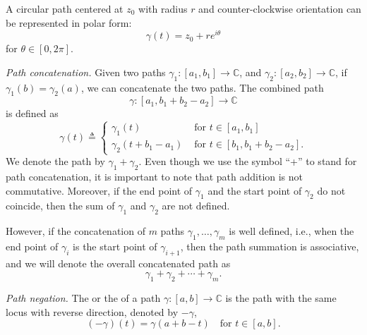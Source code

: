 

A circular path centered at $z_0$ with radius $r$ and counter-clockwise orientation can be represented in polar form:
\begin{equation}
\gamma(t) = z_0 + re^{i\theta}
\label{eq:circular_path}
\end{equation}
for $\theta\in[0, 2 \pi ]$.

{\em Path concatenation.} Given two paths $\gamma_1: [a_1,b_1] \rightarrow \mathbb{C}$, and $\gamma_2: [a_2,b_2] \rightarrow \mathbb{C}$, if $\gamma_1(b)=\gamma_2(a)$, we can concatenate the two paths. The combined path 
$$\gamma: [a_1,b_1+b_2-a_2] \rightarrow \mathbb{C}$$ 
is defined as
$$
\gamma(t) \triangleq \begin{cases}
	\gamma_1(t) & \text{ for } t \in [a_1,b_1] \\
	\gamma_2(t+b_1-a_1) & \text{ for } t \in [b_1, b_1+b_2-a_2].
\end{cases} 
$$
We denote the  path by $\gamma_1+\gamma_2$. Even though we use the symbol ``+'' to stand for path concatenation, it is important to note that path addition is not commutative. Moreover, if the end point of $\gamma_1$ and the start point of $\gamma_2$ do not coincide, then the sum of $\gamma_1$ and $\gamma_2$ are not defined.

However, if the concatenation of $m$ paths $\gamma_1,\ldots, \gamma_m$ is well defined, i.e., when the end point of $\gamma_i$ is the start point of $\gamma_{i+1}$, then the path summation is associative, and we will denote the overall concatenated path as
$$\gamma_1 + \gamma_2 + \cdots + \gamma_m.
$$


{\em Path negation.}
The  or the  of a path $\gamma:[a,b]\rightarrow\mathbb{C}$ is the path with the same locus with reverse direction, denoted by $-\gamma$,
$$
(-\gamma)(t) = \gamma(a+b-t) \quad \text{for } t\in[a,b].
$$





   


